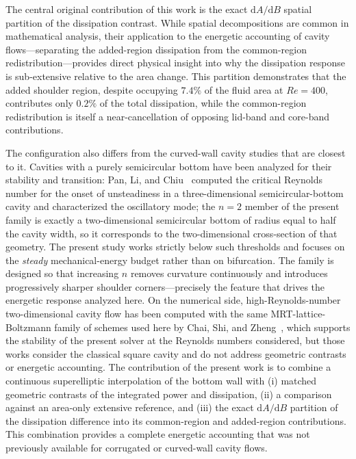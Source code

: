 The central original contribution of this work is the exact $\mathrm{d}A/\mathrm{d}B$ spatial partition of the dissipation contrast. While spatial decompositions are common in mathematical analysis, their application to the energetic accounting of cavity flows---separating the added-region dissipation from the common-region redistribution---provides direct physical insight into why the dissipation response is sub-extensive relative to the area change. This partition demonstrates that the added shoulder region, despite occupying $7.4\%$ of the fluid area at $Re=400$, contributes only $0.2\%$ of the total dissipation, while the common-region redistribution is itself a near-cancellation of opposing lid-band and core-band contributions.

The configuration also differs from the curved-wall cavity studies that are closest to it. Cavities with a purely semicircular bottom have been analyzed for their stability and transition: Pan, Li, and Chiu~\cite{Pan2025} computed the critical Reynolds number for the onset of unsteadiness in a three-dimensional semicircular-bottom cavity and characterized the oscillatory mode; the $n=2$ member of the present family is exactly a two-dimensional semicircular bottom of radius equal to half the cavity width, so it corresponds to the two-dimensional cross-section of that geometry. The present study works strictly below such thresholds and focuses on the \emph{steady} mechanical-energy budget rather than on bifurcation. The family is designed so that increasing $n$ removes curvature continuously and introduces progressively sharper shoulder corners---precisely the feature that drives the energetic response analyzed here. On the numerical side, high-Reynolds-number two-dimensional cavity flow has been computed with the same MRT-lattice-Boltzmann family of schemes used here by Chai, Shi, and Zheng~\cite{Chai2006}, which supports the stability of the present solver at the Reynolds numbers considered, but those works consider the classical square cavity and do not address geometric contrasts or energetic accounting. The contribution of the present work is to combine a continuous superelliptic interpolation of the bottom wall with (i) matched geometric contrasts of the integrated power and dissipation, (ii) a comparison against an area-only extensive reference, and (iii) the exact $\mathrm{d}A/\mathrm{d}B$ partition of the dissipation difference into its common-region and added-region contributions. This combination provides a complete energetic accounting that was not previously available for corrugated or curved-wall cavity flows.

